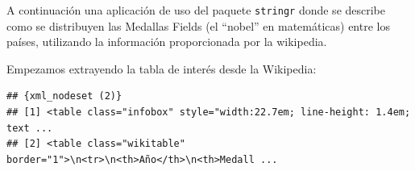 \documentclass[]{article}
\newenvironment{Shaded}{\begin{snugshade}}{\end{snugshade}}
\newcommand{\KeywordTok}[1]{\textcolor[rgb]{0.13,0.29,0.53}{\textbf{#1}}}
\newcommand{\DataTypeTok}[1]{\textcolor[rgb]{0.13,0.29,0.53}{#1}}
\newcommand{\DecValTok}[1]{\textcolor[rgb]{0.00,0.00,0.81}{#1}}
\newcommand{\StringTok}[1]{\textcolor[rgb]{0.31,0.60,0.02}{#1}}
\newcommand{\OtherTok}[1]{\textcolor[rgb]{0.56,0.35,0.01}{#1}}
\newcommand{\OperatorTok}[1]{\textcolor[rgb]{0.81,0.36,0.00}{\textbf{#1}}}
\newcommand{\NormalTok}[1]{#1}
\begin{document}
A continuación una aplicación de uso del paquete \texttt{stringr} donde
se describe como se distribuyen las Medallas Fields (el ``nobel'' en
matemáticas) entre los países, utilizando la información proporcionada
por la wikipedia.

Empezamos extrayendo la tabla de interés desde la Wikipedia:

\begin{Shaded}
\end{Shaded}

\begin{verbatim}
## {xml_nodeset (2)}
## [1] <table class="infobox" style="width:22.7em; line-height: 1.4em; text ...
## [2] <table class="wikitable" border="1">\n<tr>\n<th>Año</th>\n<th>Medall ...
\end{verbatim}

\begin{Shaded}
\end{Shaded}
\end{document}
